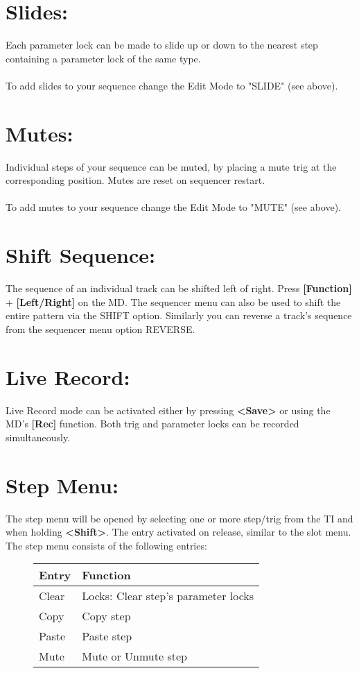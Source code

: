 \section{Slides:}
Each parameter lock can be made to slide up or down to the nearest step containing a parameter lock of the same type.
\\\\
To add slides to your sequence change the Edit Mode to "SLIDE" (see above).
\section{Mutes:}
Individual steps of your sequence can be muted, by placing a mute trig at the corresponding position. Mutes are reset on sequencer restart.\\\\ 
To add mutes to your sequence change the Edit Mode to "MUTE" (see above).
\section{Shift Sequence:}
The sequence of an individual track can be shifted left of right. Press \textbf{[Function]} + \textbf{[Left/Right]} on the MD. The sequencer menu can also be used to shift the entire pattern via the SHIFT option.
Similarly you can reverse a track's sequence from the sequencer menu option REVERSE.
\section{Live Record:}
Live Record mode can be activated either by pressing  \textbf{<Save>} or using the MD's \textbf{[Rec]} function. Both trig and parameter locks can be recorded simultaneously.
\section{Step Menu:}

The step menu will be opened by selecting one or more step/trig from the TI and when holding \textbf{<Shift>}. The entry activated on release, similar to the slot menu.
The step menu consists of the following entries:

\begin{figure}[hb]
    \begin{tabular}{|l|l|}
    \hline
    \rowcolor[HTML]{C0C0C0} 
    Entry            & Function \\ \hline
    Clear            & Locks: Clear step's parameter locks \\ \hline
    Copy         & Copy step\\ \hline
    Paste        & Paste step\\ \hline
    Mute         & Mute or Unmute step\\ \hline
    \end{tabular}
\end{figure}
